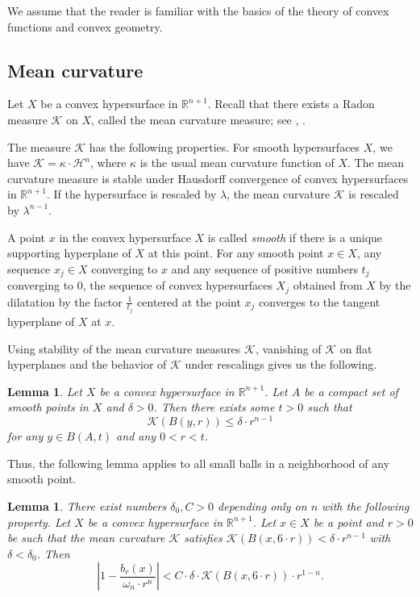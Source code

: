 \documentclass[12pt,leqno,intlimits]{amsart}
\numberwithin{equation}{section}
\newtheorem{lem}[thm]{Lemma}
\theoremstyle{definition}
\theoremstyle{remark}
\newcommand{\R}{\mathbb{R}}
\begin{document}
We assume that the reader is familiar with the basics of the theory of convex functions and convex geometry.

\subsection{Mean curvature}
Let $X$ be a convex hypersurface in $\R^{n+1}$. Recall that there exists a Radon measure $\mathcal K$ on $X$, called the mean curvature measure; see \cite{Schneider}, \cite{Fedcurvature}.

The measure $\mathcal K$ has the following properties.
For smooth hypersurfaces $X$, we have $\mathcal K=\kappa \cdot \mathcal H^n$, where $\kappa$ is the usual mean curvature function of $X$.
The mean curvature measure is stable under Hausdorff convergence of convex hypersurfaces in $\R^{n+1}$.
If the hypersurface is rescaled by $\lambda$, the mean curvature $\mathcal K$ is rescaled by $\lambda^{n-1}$. %

A point $x$ in the convex hypersurface $X$ is called \emph{smooth} if there is a unique supporting hyperplane of $X$ at this point.
For any smooth point $x\in X$, any sequence $x_j\in X$ converging to $x$ and any sequence of positive numbers $t_j$ converging to $0$, the
sequence of convex hypersurfaces $X_j$ obtained from $X$ by the dilatation by the factor $\frac 1 {t_j}$ centered at the point $x_j$ converges
to the tangent hyperplane of $X$ at $x$.

Using stability of the mean curvature measures $\mathcal K$, vanishing of $\mathcal K$ on flat hyperplanes and
the behavior of $\mathcal K$ under rescalings gives us the following.

\begin{lem} \label{lem:compsm}
Let $X$ be a convex hypersurface in $\R^{n+1}$. Let $A$ be a compact set of smooth points in $X$ and  $\delta >0$.
Then there exists some $t>0$ such that
\[\mathcal K(B(y,r)) \leq \delta \cdot r^{n-1}\]
for any $y\in B (A,{t})$ and any $0<r<t$.
\end{lem}
Thus, the following lemma applies to all small balls in a neighborhood of any smooth point.


\begin{lem} \label{lem:mean}
There exist numbers $\delta_0,C>0$ depending only on $n$ with the following property. Let $X$ be a convex hypersurface in $\R^{n+1}$.
Let $x\in X$ be a point and $r>0$ be such that the mean curvature $\mathcal K$ satisfies $\mathcal K(B (x,{6{\cdot}r})) < \delta \cdot r^{n-1}$ with $\delta <\delta _0$.
Then
\begin{equation} \label{eq:lemma}
\left| 1 - \frac {b_r (x)} { \omega _n{\cdot}r^n}\right|
<
C\cdot \delta \cdot \mathcal K( B (x,{6{\cdot}r})) \cdot r^{1-n}.
\end{equation}
\end{lem}
\end{document}
